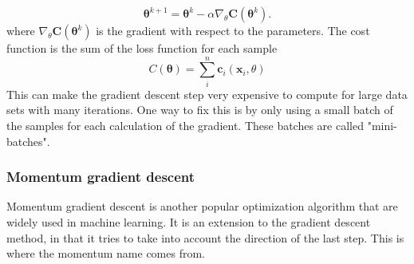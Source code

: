 \begin{equation}
    \boldsymbol{\theta}^{k+1} = \boldsymbol{\theta}^k - \alpha \nabla_\theta \boldsymbol{C}(\boldsymbol{\theta}^k).
\end{equation}
where $\nabla_\theta \boldsymbol{C}(\boldsymbol{\theta}^k)$ is the gradient with respect to the parameters.
The cost function is the sum of the loss function for each sample
\begin{equation}
    C(\boldsymbol{\theta}) = \sum_i^n \boldsymbol{c}_i(\boldsymbol{x}_i, \theta)
\end{equation}
This can make the gradient descent step very expensive to compute for large data sets with many iterations. One way to fix this is by only using a small batch of the samples for each calculation of the gradient. These batches are called "mini-batches". 

\subsubsection{Momentum gradient descent}
Momentum gradient descent is another popular optimization algorithm that are widely used in machine learning. It is an extension to the gradient descent method, in that it tries to take into account the direction of the last step. This is where the momentum name comes from. 


